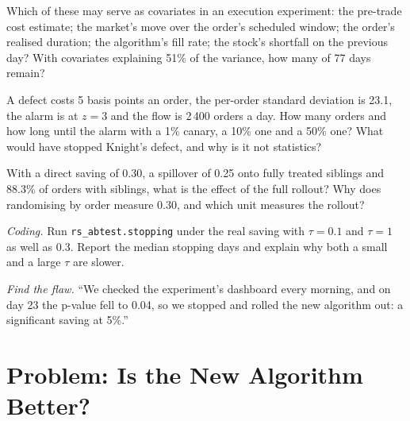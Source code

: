 \begin{exercise}[$\star\star$]\label{exo:rs:live-experiments:4}
Which of these may serve as  covariates in an execution experiment: the pre-trade cost estimate; the market's move over the order's scheduled window; the
order's realised duration; the algorithm's fill rate; the stock's shortfall on the previous day? With covariates explaining 51\% of the variance, how many of
77 days remain?
\end{exercise}

\begin{exercise}[$\star\star$]\label{exo:rs:live-experiments:5}
A defect costs 5 basis points an order, the per-order standard deviation is 23.1, the alarm is at $z = 3$ and the flow is 2\,400 orders a day. How many
orders and how long until the alarm with a 1\% canary, a 10\% one and a 50\% one? What would have stopped Knight's defect, and why is it not statistics?
\end{exercise}

\begin{exercise}[$\star\star$]\label{exo:rs:live-experiments:6}
With a direct saving of 0.30, a spillover of 0.25 onto fully treated siblings and 88.3\% of orders with siblings, what is the effect of the full rollout? Why
does randomising by order measure 0.30, and which unit measures the rollout?
\end{exercise}

\begin{exercise}[$\star\star\star$]\label{exo:rs:live-experiments:7}
\emph{Coding.} Run \texttt{rs\_abtest.stopping} under the real saving with $\tau = 0.1$ and $\tau = 1$ as well as 0.3. Report the median stopping days and
explain why both a small and a large $\tau$ are slower.
\end{exercise}

\begin{exercise}[$\star\star\star$]\label{exo:rs:live-experiments:8}
\emph{Find the flaw.} ``We checked the experiment's dashboard every morning, and on day 23 the p-value fell to 0.04, so we stopped and rolled the new
algorithm out: a significant saving at 5\%.''
\end{exercise}

\section{Problem: Is the New Algorithm Better?}

